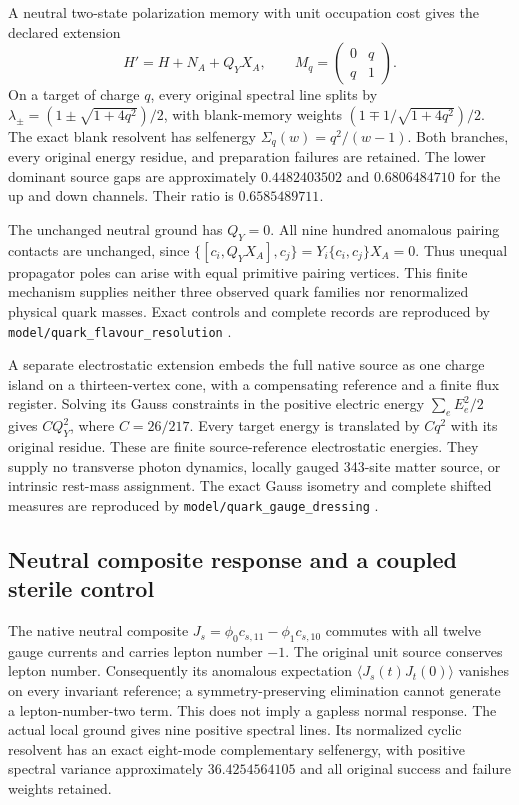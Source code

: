A neutral two-state polarization memory with unit occupation cost gives
the declared extension
\[
 H'=H+N_A+Q_YX_A,\qquad
 M_q=\begin{pmatrix}0&q\\q&1\end{pmatrix}.
\]
On a target of charge $q$, every original spectral line splits by
$\lambda_\pm=(1\pm\sqrt{1+4q^2})/2$, with blank-memory weights
$(1\mp1/\sqrt{1+4q^2})/2$. The exact blank resolvent has selfenergy
$\Sigma_q(w)=q^2/(w-1)$. Both branches, every original energy residue,
and preparation failures are retained. The lower dominant source gaps
are approximately $0.4482403502$ and $0.6806484710$ for the up and down
channels. Their ratio is $0.6585489711$.

The unchanged neutral ground has $Q_Y=0$. All nine hundred anomalous
pairing contacts are unchanged, since
$\{[c_i,Q_YX_A],c_j\}=Y_i\{c_i,c_j\}X_A=0$.
Thus unequal propagator poles can arise with equal primitive pairing
vertices. This finite mechanism supplies neither three observed quark
families nor renormalized physical quark masses. Exact controls and
complete records are reproduced by
\texttt{model/quark\_flavour\_resolution} \cite{ophrepo}.

A separate electrostatic extension embeds the full native source as one
charge island on a thirteen-vertex cone, with a compensating reference
and a finite flux register. Solving its Gauss constraints in the positive
electric energy $\sum_e E_e^2/2$ gives $C Q_Y^2$, where
$C=26/217$. Every target energy is translated by $Cq^2$ with its
original residue. These are finite source-reference electrostatic
energies. They supply no transverse photon dynamics, locally gauged
343-site matter source, or intrinsic rest-mass assignment. The exact
Gauss isometry and complete shifted measures are reproduced by
\texttt{model/quark\_gauge\_dressing} \cite{ophrepo}.

\subsection{Neutral composite response and a coupled sterile control}

The native neutral composite
$J_s=\phi_0c_{s,11}-\phi_1c_{s,10}$ commutes with all twelve gauge
currents and carries lepton number $-1$. The original unit source
conserves lepton number. Consequently its anomalous expectation
$\langle J_s(t)J_t(0)\rangle$ vanishes on every invariant reference;
a symmetry-preserving elimination cannot generate a lepton-number-two
term. This does not imply a gapless normal response. The actual local
ground gives nine positive spectral lines. Its normalized cyclic
resolvent has an exact eight-mode complementary selfenergy, with
positive spectral variance approximately $36.4254564105$ and all
original success and failure weights retained.

